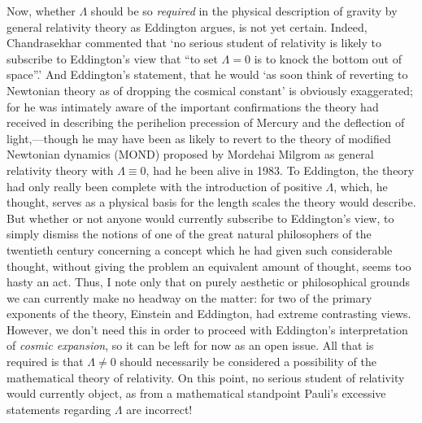 Now, whether $\Lambda$ should be so \textit{required} in the physical description of gravity by general relativity theory as Eddington argues, is not yet certain. Indeed, Chandrasekhar \cite{Chandrasekhar1983} commented that `no serious student of relativity is likely to subscribe to Eddington's view that ``to set $\Lambda=0$ is to knock the bottom out of space''.' And Eddington's statement, that he would `as soon think of reverting to Newtonian theory as of dropping the cosmical constant' is obviously exaggerated; for he was intimately aware of the important confirmations the theory had received in describing the perihelion precession of Mercury and the deflection of light,---though he may have been as likely to revert to the theory of modified Newtonian dynamics (MOND) proposed by Mordehai Milgrom \cite{Milgrom1983a,Milgrom1983b,Milgrom1983c} as general relativity theory with $\Lambda\equiv0$, had he been alive in 1983. To Eddington, the theory had only really been complete with the introduction of positive $\Lambda$, which, he thought, serves as a physical basis for the length scales the theory would describe. But whether or not anyone would currently subscribe to Eddington's view, to simply dismiss the notions of one of the great natural philosophers of the twentieth century concerning a concept which he had given such considerable thought, without giving the problem an equivalent amount of thought, seems too hasty an act. Thus, I note only that on purely aesthetic or philosophical grounds we can currently make no headway on the matter: for two of the primary exponents of the theory, Einstein and Eddington, had extreme contrasting views. However, we don't need this in order to proceed with Eddington's interpretation of \textit{cosmic expansion}, so it can be left for now as an open issue. All that is required is that $\Lambda\neq0$ should necessarily be considered a possibility of the mathematical theory of relativity. On this point, no serious student of relativity would currently object, as from a mathematical standpoint Pauli's excessive statements regarding $\Lambda$ are incorrect!

